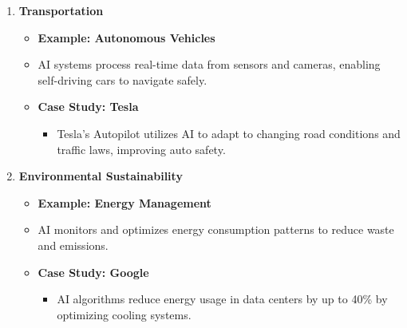 \documentclass{beamer}
\begin{document}
\begin{frame}[fragile]
\begin{enumerate}
        \item \textbf{Transportation}
            \begin{itemize}
                \item \textbf{Example: Autonomous Vehicles}
                \item AI systems process real-time data from sensors and cameras, enabling self-driving cars to navigate safely.
                \item \textbf{Case Study: Tesla}
                \begin{itemize}
                    \item Tesla’s Autopilot utilizes AI to adapt to changing road conditions and traffic laws, improving auto safety.
                \end{itemize}
            \end{itemize}

        \item \textbf{Environmental Sustainability}
            \begin{itemize}
                \item \textbf{Example: Energy Management}
                \item AI monitors and optimizes energy consumption patterns to reduce waste and emissions.
                \item \textbf{Case Study: Google}
                \begin{itemize}
                    \item AI algorithms reduce energy usage in data centers by up to 40\% by optimizing cooling systems.
                \end{itemize}
            \end{itemize}
    \end{enumerate}
\end{frame}
\end{document}
